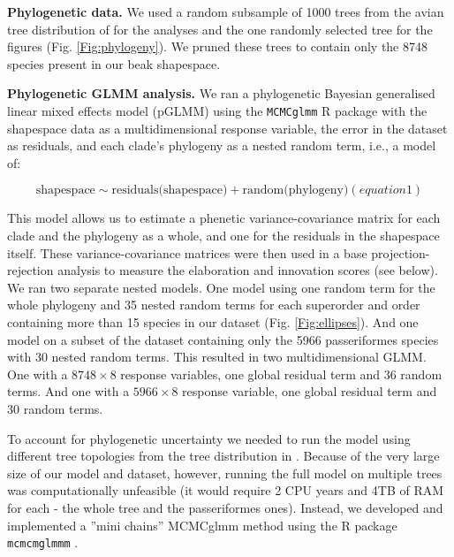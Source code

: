 \documentclass[12pt,letterpaper]{article}
\begin{document}
\textbf{Phylogenetic data.}
We used a random subsample of 1000 trees from the avian tree distribution of \cite{jetz2012global} for the analyses and the one randomly selected tree for the figures (Fig. \ref{Fig:phylogeny}).
We pruned these trees to contain only the 8748 species present in our beak shapespace.




\textbf{Phylogenetic GLMM analysis.}
We ran a phylogenetic Bayesian generalised linear mixed effects model (pGLMM) using the \texttt{MCMCglmm} R package \cite{MCMCglmm} with the shapespace data as a multidimensional response variable, the error in the dataset as residuals, and each clade's phylogeny as a nested random term, i.e., a model of:

\begin{equation}
\text{shapespace} \mathtt{\sim} \text{residuals(shapespace)} + \text{random(phylogeny)} (equation 1)
\end{equation}

This model allows us to estimate a phenetic variance-covariance matrix for each clade and the phylogeny as a whole, and one for the residuals in the shapespace itself.
These variance-covariance matrices were then used in a base projection-rejection analysis to measure the elaboration and innovation scores (see below).
We ran two separate nested models.
One model using one random term for the whole phylogeny and 35 nested random terms for each superorder and order containing more than 15 species in our dataset (Fig. \ref{Fig:ellipses}).
And one model on a subset of the dataset containing only the 5966 passeriformes species with 30 nested random terms.
This resulted in two multidimensional GLMM.
One with a $8748 \times 8$ response variables, one global residual term and 36 random terms.
And one with a $5966 \times 8$ response variable, one global residual term and 30 random terms.
 
To account for phylogenetic uncertainty we needed to run the model using different tree topologies from the tree distribution in \cite{jetz2012global}.
Because of the very large size of our model and dataset, however, running the full model on multiple trees was computationally unfeasible (it would require 2 CPU years and 4TB of RAM for each - the whole tree and the passeriformes ones).
Instead, we developed and implemented a ''mini chains'' MCMCglmm method using the R package \texttt{mcmcmglmmm} \cite{mcmcmcglmmm}.
\end{document}
